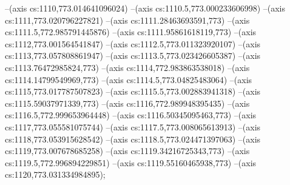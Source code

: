 --(axis cs:1110,773.014641096024)
--(axis cs:1110.5,773.000233606998)
--(axis cs:1111,773.020796227821)
--(axis cs:1111.28463693591,773)
--(axis cs:1111.5,772.985791445876)
--(axis cs:1111.95861618119,773)
--(axis cs:1112,773.001564541847)
--(axis cs:1112.5,773.011323920107)
--(axis cs:1113,773.057808861947)
--(axis cs:1113.5,773.023426605387)
--(axis cs:1113.76472985824,773)
--(axis cs:1114,772.983863538018)
--(axis cs:1114.14799549969,773)
--(axis cs:1114.5,773.04825483064)
--(axis cs:1115,773.017787507823)
--(axis cs:1115.5,773.002883941318)
--(axis cs:1115.59037971339,773)
--(axis cs:1116,772.989948395435)
--(axis cs:1116.5,772.999653964448)
--(axis cs:1116.50345095463,773)
--(axis cs:1117,773.055581075744)
--(axis cs:1117.5,773.008065613913)
--(axis cs:1118,773.053915628542)
--(axis cs:1118.5,773.024471397063)
--(axis cs:1119,773.007678685258)
--(axis cs:1119.34216725343,773)
--(axis cs:1119.5,772.996894229851)
--(axis cs:1119.55160465938,773)
--(axis cs:1120,773.031334984895);
